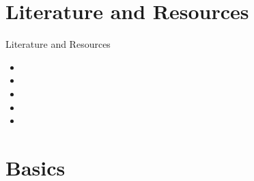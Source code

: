 \documentclass[aspectratio=169,fleqn]{beamer}
\begin{document}

\section{Literature and Resources} %
\label{sec:literature_and_resources}

  \begin{frame}{Literature and Resources}
    \begin{itemize}
      \item {}
      \item {}
      \item {}
      \item {}
      \item {}
    \end{itemize}
  \end{frame}


\section{Basics} %
\label{sec:basics}

\end{document}
